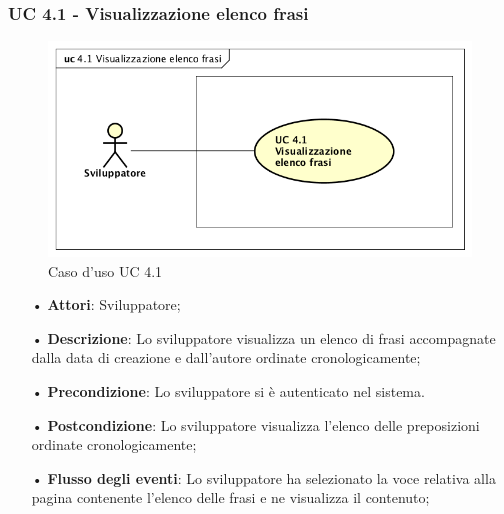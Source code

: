 \subsubsection{UC 4.1 - Visualizzazione elenco frasi}
\begin{figure}[H]
\centering
\includegraphics[width=17cm]{img/UC410.png} 
\caption{Caso d'uso UC 4.1}\label{fig:410}
\end{figure}
\begin{itemize}
\item[•]\textbf{Attori}: Sviluppatore;
\item[•]\textbf{Descrizione}: Lo sviluppatore visualizza un elenco di frasi accompagnate dalla data di creazione e dall'autore ordinate cronologicamente;
\item[•]\textbf{Precondizione}:  Lo sviluppatore si è autenticato nel sistema.%
\item[•]\textbf{Postcondizione}: Lo sviluppatore visualizza l'elenco delle preposizioni ordinate cronologicamente;
\item[•]\textbf{Flusso degli eventi}: Lo sviluppatore ha selezionato la voce relativa alla pagina contenente l’elenco delle frasi e ne visualizza il contenuto; 
\end{itemize}
